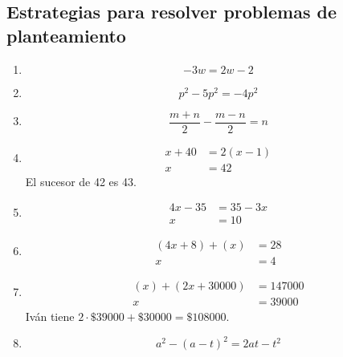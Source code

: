 \documentclass{sn-guia}
\begin{document}
 
\raggedright
\setcounter{section}{11}
\subsection{Estrategias para resolver problemas de planteamiento}
\begin{enumerate}
    \item \begin{equation*}
        [4(w-1) + (w+2)] -3w = 2w -2 
    \end{equation*}
    \item \begin{equation*}
        p^2 - 5p^2 = -4p^2 
    \end{equation*}
    \item \begin{equation*}
        \frac{m+n}{2} - \frac{m-n}{2} = n
    \end{equation*}
    \item \begin{align*}
        x + 40 &= 2\left( x-1 \right) \\
        x      &= 42
    \end{align*}
    El sucesor de 42 es 43.
    \item \begin{align*}
        4x - 35 &= 35 - 3x \\
        x &= 10
    \end{align*}
    \item \begin{align*}
        \left( 4x+8 \right) + \left( x \right) &= 28 \\
        x &= 4
    \end{align*}
    \item \begin{align*}
        \left( x \right) + \left( 2x+30000 \right) &= 147000 \\
        x &= 39000
    \end{align*}
    Iván tiene $2\cdot\$ 39000 + \$ 30000 = \$ 108000$.
    \item \begin{equation*}
        a^2 - \left( a-t \right)^2 = 2at - t^2
    \end{equation*}
\end{enumerate}
\end{document}
